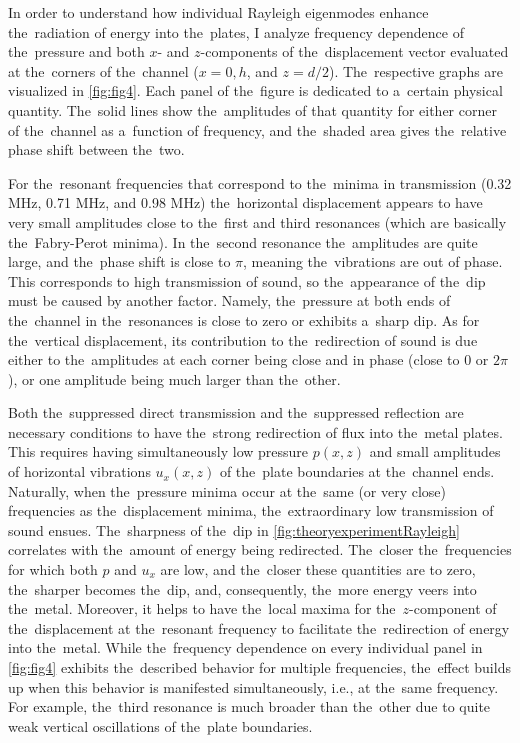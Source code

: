 In order to understand how individual Rayleigh eigenmodes enhance the~radiation of energy into the~plates, I analyze frequency dependence of the~pressure and both $x$- and $z$-components of the~displacement vector evaluated at the~corners of the~channel ($x=0,h$, and $z=d/2$).
The~respective graphs are visualized in \cref{fig:fig4}.
Each panel of the~figure is dedicated to a~certain physical quantity.
The~solid lines show the~amplitudes of that quantity for either corner of the~channel as a~function of frequency, and the~shaded area gives the~relative phase shift between the~two.

For the~resonant frequencies that correspond to the~minima in transmission (0.32 MHz, 0.71 MHz, and 0.98 MHz) the~horizontal displacement appears to have very small amplitudes close to the~first and third resonances (which are basically the~Fabry-Perot minima).
In the~second resonance the~amplitudes are quite large, and the~phase shift is close to $\pi$, meaning the~vibrations are out of phase.
This corresponds to high transmission of sound, so the~appearance of the~dip must be caused by another factor.
Namely, the~pressure at both ends of the~channel in the~resonances is close to zero or exhibits a~sharp dip.
As for the~vertical displacement, its contribution to the~redirection of sound is due either to the~amplitudes at each corner being close and in phase (close to $0$ or $2\pi$), or one amplitude being much larger than the~other.

Both the~suppressed direct transmission and the~suppressed reflection are necessary conditions to have the~strong redirection of flux into the~metal plates.
This requires having simultaneously low pressure $p(x,z)$ and small amplitudes of horizontal vibrations $u_x(x,z)$ of the~plate boundaries at the~channel ends.
Naturally, when the~pressure minima occur at the~same (or very close) frequencies as the~displacement minima, the~extraordinary low transmission of sound ensues.
The~sharpness of the~dip in \cref{fig:theoryexperimentRayleigh} correlates with the~amount of energy being redirected.
The~closer the~frequencies for which both $p$ and $u_x$ are low, and the~closer these quantities are to zero, the~sharper becomes the~dip, and, consequently, the~more energy veers into the~metal.
Moreover, it helps to have the~local maxima for the~$z$-component of the~displacement at the~resonant frequency to facilitate the~redirection of energy into the~metal.
While the~frequency dependence on every individual panel in \cref{fig:fig4} exhibits the~described behavior for multiple frequencies, the~effect builds up when this behavior is manifested simultaneously, i.e., at the~same frequency.
For example, the~third resonance is much broader than the~other due to quite weak vertical oscillations of the~plate boundaries.

